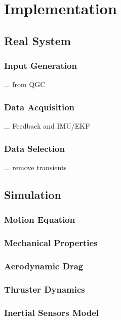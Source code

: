 \chapter{Implementation}
\label{chap:implementation}

\section{Real System}
\label{sec:real_system}
\subsection{Input Generation}
\label{sub:input_generation}
... from QGC

\subsection{Data Acquisition}
\label{sub:data_acquisition}
... Feedback and IMU/EKF

\subsection{Data Selection}
\label{sub:data_selection}
... remove transients


\section{Simulation}
\label{sec:simulation}

\subsection{Motion Equation}
\label{sub:motion_equation}

\subsection{Mechanical Properties}
\label{sub:mech_properties}

\subsection{Aerodynamic Drag}
\label{sub:aero_drag}

\subsection{Thruster Dynamics}
\label{sub:thrust_dynamics}

\subsection{Inertial Sensors Model}
\label{sub:imu_model}

